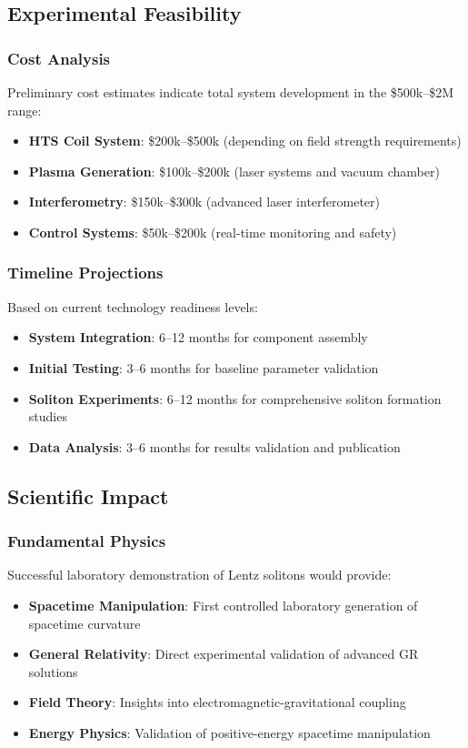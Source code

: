 \documentclass[12pt,a4paper]{article}
\begin{document}
\subsection{Experimental Feasibility}

\subsubsection{Cost Analysis}
Preliminary cost estimates indicate total system development in the \$500k--\$2M range:
\begin{itemize}
\item \textbf{HTS Coil System}: \$200k--\$500k (depending on field strength requirements)
\item \textbf{Plasma Generation}: \$100k--\$200k (laser systems and vacuum chamber)
\item \textbf{Interferometry}: \$150k--\$300k (advanced laser interferometer)
\item \textbf{Control Systems}: \$50k--\$200k (real-time monitoring and safety)
\end{itemize}

\subsubsection{Timeline Projections}
Based on current technology readiness levels:
\begin{itemize}
\item \textbf{System Integration}: 6--12 months for component assembly
\item \textbf{Initial Testing}: 3--6 months for baseline parameter validation
\item \textbf{Soliton Experiments}: 6--12 months for comprehensive soliton formation studies
\item \textbf{Data Analysis}: 3--6 months for results validation and publication
\end{itemize}

\subsection{Scientific Impact}

\subsubsection{Fundamental Physics}
Successful laboratory demonstration of Lentz solitons would provide:
\begin{itemize}
\item \textbf{Spacetime Manipulation}: First controlled laboratory generation of spacetime curvature
\item \textbf{General Relativity}: Direct experimental validation of advanced GR solutions
\item \textbf{Field Theory}: Insights into electromagnetic-gravitational coupling
\item \textbf{Energy Physics}: Validation of positive-energy spacetime manipulation
\end{itemize}
\end{document}
